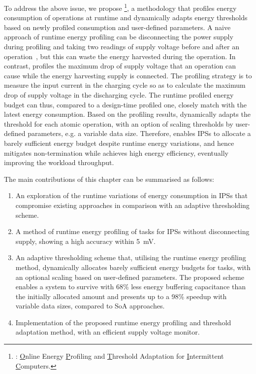 To address the above issue, we propose \nn{}\footnote{\nn{}: \underline{O}nline Energy \underline{P}rofiling and \underline{T}hreshold Adaptation for \underline{I}ntermittent \underline{C}omputers. }, a methodology that profiles energy consumption of operations at runtime and dynamically adapts energy thresholds based on newly profiled consumption and user-defined parameters. 
A naive approach of runtime energy profiling can be disconnecting the power supply during profiling and taking two readings of supply voltage before and after an operation~\cite{zhan2020adaptive}, but this can waste the energy harvested during the operation. 
In contrast, \nn{} profiles the maximum drop of supply voltage that an operation can cause while the energy harvesting supply is connected. 
The profiling strategy is to measure the input current in the charging cycle so as to calculate the maximum drop of supply voltage in the discharging cycle. 
The runtime profiled energy budget can thus, compared to a design-time profiled one, closely match with the latest energy consumption. 
Based on the profiling results, \nn{} dynamically adapts the threshold for each atomic operation, with an option of scaling thresholds by user-defined parameters, e.g. a variable data size.
Therefore, \nn{} enables IPSs to allocate a barely sufficient energy budget despite runtime energy variations, and hence mitigates non-termination while achieves high energy efficiency, eventually improving the workload throughput.

The main contributions of this chapter can be summarised as follows:

\begin{enumerate}
    \item An exploration of the runtime variations of energy consumption in IPSs that compromise existing approaches in comparison with an adaptive thresholding scheme. 
    \item A method of runtime energy profiling of tasks for IPSs without disconnecting supply, showing a high accuracy within \SI{5}{\milli\volt}.
    \item An adaptive thresholding scheme that, utilising the runtime energy profiling method, dynamically allocates barely sufficient energy budgets for tasks, with an optional scaling based on user-defined parameters. 
    The proposed scheme enables a system to survive with 68\% less energy buffering capacitance than the initially allocated amount and presents up to a 98\% speedup with variable data sizes, compared to SoA approaches.
    \item Implementation of the proposed runtime energy profiling and threshold adaptation method, with an efficient supply voltage monitor.
\end{enumerate}

